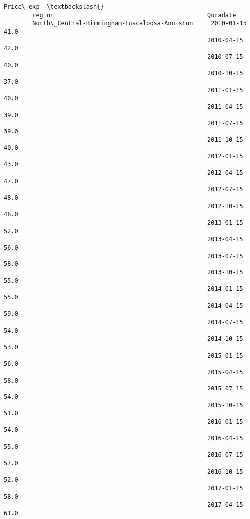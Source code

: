 \documentclass[11pt]{article}
\begin{document}
\begin{Verbatim}[commandchars=\\\{\}]
                                                                     Price\_exp  \textbackslash{}
        region                                           Quradate                
        North\_Central-Birmingham-Tuscaloosa-Anniston     2010-01-15       41.0   
                                                         2010-04-15       42.0   
                                                         2010-07-15       40.0   
                                                         2010-10-15       37.0   
                                                         2011-01-15       40.0   
                                                         2011-04-15       39.0   
                                                         2011-07-15       39.0   
                                                         2011-10-15       40.0   
                                                         2012-01-15       43.0   
                                                         2012-04-15       47.0   
                                                         2012-07-15       48.0   
                                                         2012-10-15       48.0   
                                                         2013-01-15       52.0   
                                                         2013-04-15       56.0   
                                                         2013-07-15       58.0   
                                                         2013-10-15       55.0   
                                                         2014-01-15       55.0   
                                                         2014-04-15       59.0   
                                                         2014-07-15       54.0   
                                                         2014-10-15       53.0   
                                                         2015-01-15       56.0   
                                                         2015-04-15       58.0   
                                                         2015-07-15       54.0   
                                                         2015-10-15       51.0   
                                                         2016-01-15       54.0   
                                                         2016-04-15       55.0   
                                                         2016-07-15       57.0   
                                                         2016-10-15       52.0   
                                                         2017-01-15       58.0   
                                                         2017-04-15       61.0   

\end{Verbatim}
\end{document}
